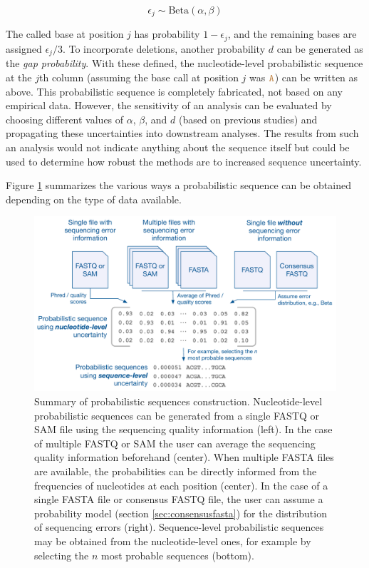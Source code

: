 \documentclass[12pt]{article}
\begin{document}
$$
\epsilon_j \sim\text{Beta}(\alpha, \beta)
$$

The called base at position $j$ has probability $1-\epsilon_j$, and the remaining bases are assigned $\epsilon_j/3$.
To incorporate deletions, another probability $d$ can be generated as the \emph{gap probability}.
With these defined, the nucleotide-level probabilistic sequence at the $j$th column (assuming the base call at position $j$ was $\texttt{\textcolor{brown}{A}}$) can be written as above.
This probabilistic sequence is completely fabricated, \ie not based on any empirical data.
However, the sensitivity of an analysis can be evaluated by choosing different values of $\alpha$, $\beta$, and $d$ (\eg based on previous studies) and propagating these uncertainties into downstream analyses.
The results from such an analysis would not indicate anything about the sequence itself but could be used to determine how robust the methods are to increased sequence uncertainty.

Figure \ref{fig:probseq} summarizes the various ways a probabilistic sequence can be obtained depending on the type of data available. 

\begin{figure}
\centering
\includegraphics[width=0.9\linewidth]{figs/fig-probseq.pdf}
\caption{Summary of probabilistic sequences construction. Nucleotide-level probabilistic sequences can be generated from a single FASTQ or SAM file using the sequencing quality information (left). In the case of multiple FASTQ or SAM the user can average the sequencing quality information beforehand (center). When multiple FASTA files are available, the probabilities can be directly informed from the frequencies of nucleotides at each position (center). In the case of a single FASTA file or consensus FASTQ file, the user can assume a probability model (section \ref{sec:consensusfasta}) for the distribution of sequencing errors (right). 
Sequence-level probabilistic sequences may be obtained from the nucleotide-level ones, for example by selecting the $n$ most probable sequences (bottom).}
\label{fig:probseq}
\end{figure}
\end{document}
